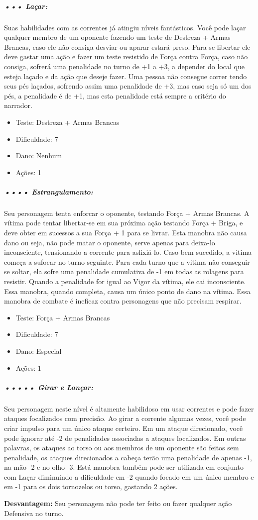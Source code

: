 \subparagraph{\bf ••• Laçar:}
Suas habilidades com as correntes já atingiu níveis fantásticos. Você pode laçar qualquer membro de um oponente fazendo um teste de Destreza + Armas Brancas, caso ele não consiga desviar ou aparar estará preso. Para se libertar ele deve gastar uma ação e fazer um teste resistido de Força contra Força, caso não consiga, sofrerá uma penalidade no turno de +1 a +3, a depender do local que esteja laçado e da ação que deseje fazer. Uma pessoa não consegue correr tendo seus pés laçados, sofrendo assim uma penalidade de +3, mas caso seja só um dos pés, a penalidade é de +1, mas esta penalidade está sempre a critério do narrador.
\begin{itemize}[noitemsep]
\item Teste: Destreza + Armas Brancas
\item Dificuldade: 7
\item Dano: Nenhum
\item Ações: 1
\end{itemize}

\subparagraph{\bf •••• Estrangulamento:}
Seu personagem tenta enforcar o oponente, testando Força + Armas Brancas. A vítima pode tentar libertar-se em sua próxima ação testando Força + Briga, e deve obter em sucessos a sua Força + 1 para se livrar. Esta manobra não causa dano ou seja, não pode matar o oponente, serve apenas para deixa-lo inconsciente, tensionando a corrente para asfixiá-lo. Caso bem sucedido, a vitima começa a sufocar no turno seguinte. Para cada turno que a vitima não conseguir se soltar, ela sofre uma penalidade cumulativa de -1 em todas as rolagens para resistir. Quando a penalidade for igual ao Vigor da vítima, ele cai inconsciente. Essa manobra, quando completa, causa um único ponto de dano na vítima. Essa manobra de combate é ineficaz contra personagens que não precisam respirar.
\begin{itemize}[noitemsep]
\item Teste: Força + Armas Brancas
\item Dificuldade: 7
\item Dano: Especial
\item Ações: 1
\end{itemize}

\subparagraph{\bf ••••• Girar e Lançar:}
Seu personagem neste nível é altamente habilidoso em usar correntes e pode fazer ataques focalizados com precisão. Ao girar a corrente algumas vezes, você pode criar impulso para um único ataque certeiro. Em um ataque direcionado, você pode ignorar até -2 de penalidades associadas a ataques localizados. Em outras palavras, os ataques ao torso ou aos membros de um oponente são feitos sem penalidade, os ataques direcionados a cabeça terão uma penalidade de apenas -1, na mão -2 e no olho -3. Está manobra também pode ser utilizada em conjunto com Laçar diminuindo a dificuldade em -2 quando focado em um único membro e em -1 para os dois tornozelos ou torso, gastando 2 ações.

{\bf Desvantagem:} Seu personagem não pode ter feito ou fazer qualquer ação Defensiva no turno.